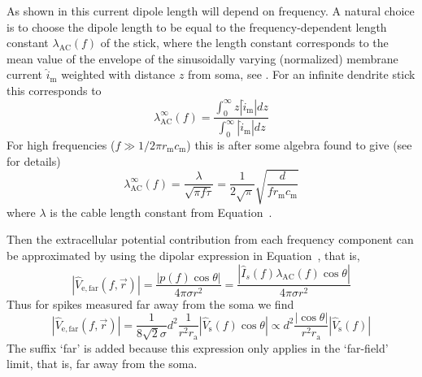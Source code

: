 As shown in  this current  dipole length will depend on frequency. A natural choice is to choose the dipole length to be equal to the frequency-dependent length constant $\lambda_\mathrm{AC}(f)$ of the stick,
where the length constant corresponds to the mean value of the 
envelope of the sinusoidally varying (normalized) membrane current
$\hat{i}_\mathrm{m}$ weighted with distance $z$ from soma, see . 
For an infinite dendrite stick this corresponds to
%
\begin{equation}
  \lambda_\mathrm{AC}^\infty(f) = \frac{\int_0^\infty z |\hat{i}_\mathrm{m}| dz}{\int_0^\infty |\hat{i}_\mathrm{m}| dz} 
  \label{eq:Spikes:formula_lambda_ac}
\end{equation}
%
For high frequencies ($f \gg 1/2 \pi r_\mathrm{m} c_\mathrm{m}$) this is after some algebra 
found to give (see  for details)
%
\begin{equation}
 \lambda_\mathrm{AC}^\infty(f) =  \frac{\lambda}{\sqrt{\pi f \tau}} = 
  \frac{1}{2\sqrt{\pi}} \sqrt{\frac{d}{f r_\mathrm{m} c_\mathrm{m}}}
\label{eq:Spikes:approx_lambda_ac}
\end{equation}
%
where $\lambda$ is the cable length constant from Equation~.


Then the extracellular potential contribution from each frequency component can be approximated by using the 
dipolar expression in Equation~, that is,
\begin{equation}
  |\hat{V}_\mathrm{e,far}(f,\vec{r})| =  \frac{|p(f) \cos \theta|}{4 \pi \sigma r^2} 
                                            = \frac{| \hat{I}_{s}(f) \lambda_\mathrm{AC}(f) \cos \theta|}{4 \pi \sigma r^2}   
                                                                                        \label{eq:Spikes:Ve_far_1}
\end{equation}
Thus for spikes measured far away from the soma we find 
%  
\begin{equation}
  |\hat{V}_\mathrm{e,far}(f,\vec{r})|  = \frac{1}{8 \sqrt{2} \sigma} d^{2} \frac{1}{r^2  r_\mathrm{a}} 
      |\hat{V}_\mathrm{s}(f) \cos \theta | 
  \propto d^{2} \frac{|\cos \theta|}{r^2  r_\mathrm{a}} |\hat{V}_\mathrm{s}(f)| 
  \label{eq:Spikes:Ve_far_2}
\end{equation}
The suffix `far' is added because this expression only applies in the `far-field' limit, that is,
far away from the soma. 
%



